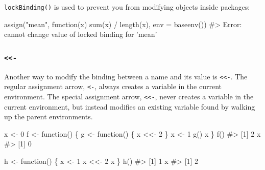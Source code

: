 \documentclass[oneside]{book}
\newenvironment{Shaded}{}{}
\newcommand{\KeywordTok} [1]{\textcolor[rgb]{0.00,0.44,0.13}{{#1}}}
\newcommand{\DataTypeTok}[1]{\textcolor[rgb]{0.56,0.13,0.00}{{#1}}}
\newcommand{\DecValTok}  [1]{\textcolor[rgb]{0.25,0.63,0.44}{{#1}}}
\newcommand{\StringTok}  [1]{\textcolor[rgb]{0.25,0.44,0.63}{{#1}}}
\newcommand{\CommentTok} [1]{\textcolor[rgb]{0.38,0.63,0.69}{{#1}}}
\newcommand{\NormalTok}  [1]{{#1}}
\begin{document}
\begin{Shaded}
\end{Shaded}

\texttt{lockBinding()} is used to prevent you from modifying objects
inside packages:

\begin{Shaded}
\begin{Highlighting}[]
\KeywordTok{assign}\NormalTok{(}\StringTok{"mean"}\NormalTok{, function(x) }\KeywordTok{sum}\NormalTok{(x) /}\StringTok{ }\KeywordTok{length}\NormalTok{(x), }\DataTypeTok{env =} \KeywordTok{baseenv}\NormalTok{())}
\CommentTok{#> Error: cannot change value of locked binding for 'mean'}
\end{Highlighting}
\end{Shaded}

\subsubsection{\texttt{\textless{}\textless{}-}}\label{section}

Another way to modify the binding between a name and its value is
\texttt{\textless{}\textless{}-}. The regular assignment arrow,
\texttt{\textless{}-}, always creates a variable in the current
environment. The special assignment arrow,
\texttt{\textless{}\textless{}-}, never creates a variable in the
current environment, but instead modifies an existing variable found by
walking up the parent environments.

\begin{Shaded}
\begin{Highlighting}[]
\NormalTok{x <-}\StringTok{ }\DecValTok{0}
\NormalTok{f <-}\StringTok{ }\NormalTok{function() \{}
  \NormalTok{g <-}\StringTok{ }\NormalTok{function() \{}
    \NormalTok{x <<-}\StringTok{ }\DecValTok{2}
  \NormalTok{\}}
  \NormalTok{x <-}\StringTok{ }\DecValTok{1}
  \KeywordTok{g}\NormalTok{()}
  \NormalTok{x}
\NormalTok{\}}
\KeywordTok{f}\NormalTok{()}
\CommentTok{#> [1] 2}
\NormalTok{x}
\CommentTok{#> [1] 0}

\NormalTok{h <-}\StringTok{ }\NormalTok{function() \{}
  \NormalTok{x <-}\StringTok{ }\DecValTok{1}
  \NormalTok{x <<-}\StringTok{ }\DecValTok{2}
  \NormalTok{x}
\NormalTok{\}}
\KeywordTok{h}\NormalTok{()}
\CommentTok{#> [1] 1}
\NormalTok{x}
\CommentTok{#> [1] 2}
\end{Highlighting}
\end{Shaded}
\end{document}
